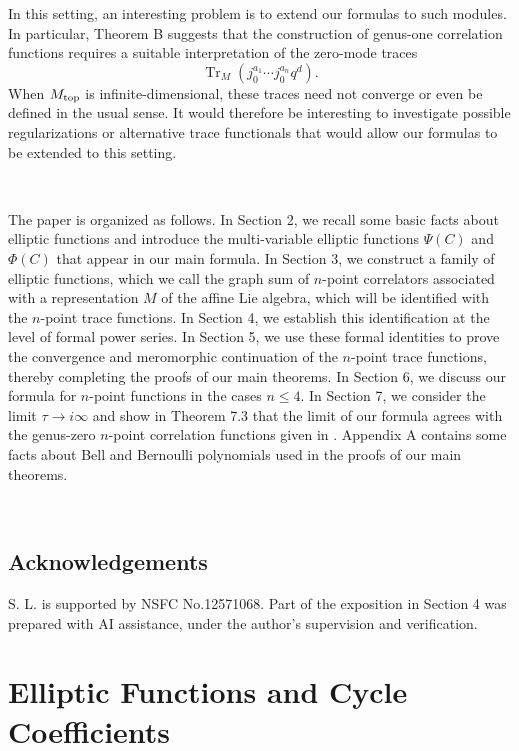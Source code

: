 \documentclass[11pt,a4paper]{amsart}
\numberwithin{equation}{section}
\theoremstyle{definition}
\theoremstyle{remark}
\begin{document}
 In this setting, an interesting problem is to extend our formulas to such modules. In particular, Theorem B suggests that the construction of genus-one correlation functions requires a suitable interpretation of the zero-mode traces
 \[
 \operatorname{Tr}_M \left(
 j_0^{a_1}\cdots j_0^{a_n}q^d
 \right).
 \]
 When $M_{\rm top}$ is infinite-dimensional, these traces need not converge or even be defined in the usual sense. It would therefore be interesting to investigate possible regularizations or alternative trace functionals that would allow our formulas to be extended to this setting.
 
 
 
 
\


The paper is organized as follows. In Section 2, we recall some basic facts about elliptic functions and introduce the multi-variable elliptic functions 
$\Psi (C) $ and $\Phi ( C)$ 
that appear in our main formula. In Section 3, we construct a family of elliptic functions, which we call the graph sum of $n$-point correlators  associated with a representation 
$M$ of the affine Lie algebra, which will be identified with the 
$n$-point trace functions. In Section 4, we establish this identification at the level of formal power series. In Section 5, we use these formal identities to prove the convergence and meromorphic continuation of the 
$n$-point trace functions, thereby completing the proofs of our main theorems. In Section 6, we discuss our formula for 
$n$-point functions in the cases $n \leq 4 $.
 In Section 7, we consider the limit $\tau \to i \infty $
and show in Theorem 7.3 that the limit of our formula agrees with the genus-zero 
$n$-point correlation functions given in \cite{FrenkelZhu}. Appendix A contains some facts about Bell and Bernoulli polynomials used in the proofs of our main theorems.





\



\subsection*{Acknowledgements}
S. L. is supported by NSFC No.12571068. Part of the exposition in Section 4 was prepared with AI assistance, under the author's supervision and verification.




\section{Elliptic Functions and Cycle Coefficients}
\label{sec:elliptic-kernels}
\end{document}
